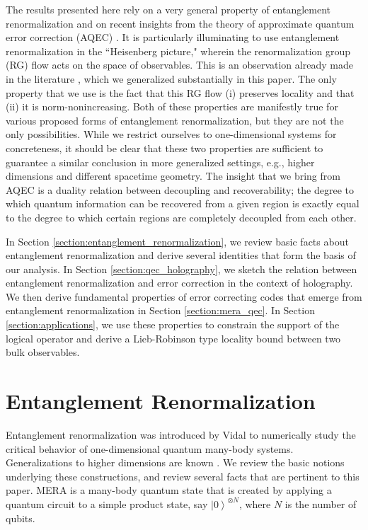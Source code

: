 \documentclass[a4paper,11pt]{article}
\newcommand{\ket}[1]{\left|#1\right\rangle}
\newcommand{\1}{\mathbbm{1}}
\begin{document}
The results presented here rely on a very general property of entanglement renormalization and on recent insights from the theory of approximate quantum
error correction (AQEC) \cite{Flammia2016}. It is particularly illuminating to use entanglement renormalization in the ``Heisenberg picture," wherein the renormalization group (RG)
flow acts on the space of observables. This is an observation already made in the literature \cite{Evenbly2007,Giovannetti2008}, which we generalized substantially in this paper.
The only property that we use is the fact that this RG flow (i) preserves locality and that (ii) it is norm-nonincreasing.
Both of these properties are manifestly true for various proposed forms of entanglement renormalization, but they are not the only possibilities. While we restrict
ourselves to one-dimensional systems for concreteness, it should be clear that these two properties are sufficient to guarantee a similar conclusion in more
generalized settings, e.g., higher dimensions and different spacetime geometry. The insight that we bring from AQEC is a duality relation between decoupling and recoverability; the degree to which  quantum
information can be recovered from a given region is exactly equal to the degree to which certain regions are completely decoupled from each other\cite{Kretschmann2008,Beny2010,Flammia2016}.

In Section \ref{section:entanglement_renormalization}, we review basic facts about entanglement renormalization and derive several identities that form the basis of our analysis.
In Section \ref{section:qec_holography}, we sketch the relation between entanglement renormalization and error correction in the context of holography. We then derive fundamental
properties of error correcting codes that emerge from entanglement renormalization in Section \ref{section:mera_qec}. In Section \ref{section:applications}, we use these properties to constrain
the support of the logical operator and derive a Lieb-Robinson type locality bound between two bulk observables.

\section{Entanglement Renormalization\label{section:entanglement_renormalization}}
Entanglement renormalization was introduced by Vidal \cite{Vidal2007,Vidal2008} to numerically study the critical behavior of one-dimensional quantum many-body
systems. Generalizations to higher dimensions are known \cite{Evenbly2009}. We review the basic notions underlying these constructions, and review several facts that
are pertinent to this paper. MERA is a many-body quantum state that is created by applying a  quantum circuit to a simple product state, say $\ket{0}^{\otimes N}$,
where $N$ is the number of qubits.
\end{document}
